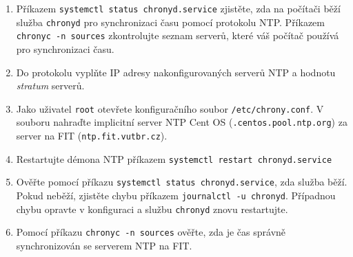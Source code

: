 \documentclass[a4paper,11pt]{article}
\begin{document}
\begin{enumerate}
  \item Příkazem {\tt systemctl status chronyd.service} zjistěte, zda na počítači běží služba \texttt{chronyd} pro synchronizaci času pomocí protokolu NTP. Příkazem {\tt chronyc -n sources} zkontrolujte seznam serverů, které váš počítač používá
    pro synchronizaci času.

  \item Do protokolu vyplňte IP adresy nakonfigurovaných serverů NTP a hodnotu {\em stratum}  serverů.

  \item Jako uživatel \texttt{root} otevřete konfiguračního soubor {\tt /etc/chrony.conf}. V souboru
    nahraďte implicitní server NTP Cent OS ({\tt *.centos.pool.ntp.org}) za server na FIT ({\tt ntp.fit.vutbr.cz}). 
  \item Restartujte démona NTP příkazem {\tt systemctl restart chronyd.service}
  \item  Ověřte pomocí příkazu {\tt systemctl status chronyd.service}, zda služba běží. Pokud neběží, zjistěte chybu příkazem {\tt journalctl -u chronyd}. Případnou chybu opravte v konfiguraci a službu {\tt chronyd} znovu restartujte.
  \item Pomocí příkazu {\tt chronyc -n sources} ověřte, zda je čas správně synchronizován se serverem NTP na FIT.

\end{enumerate}
\end{document}
